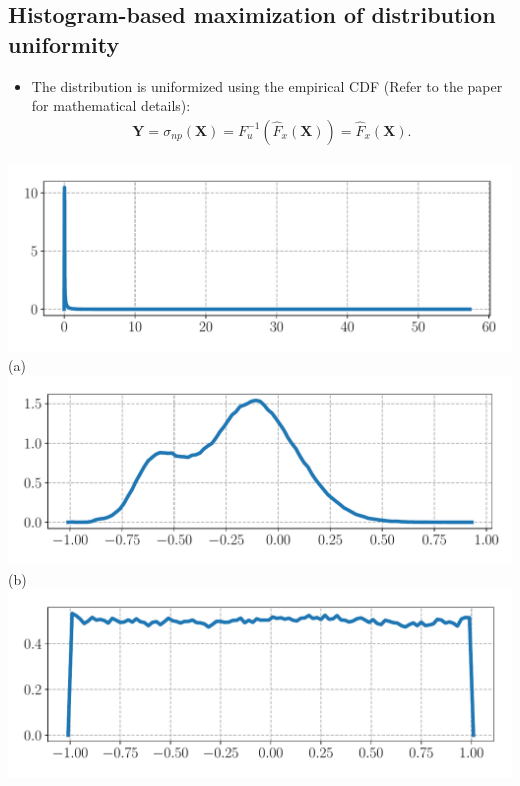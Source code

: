 \documentclass[a0,portrait]{a0poster}
\newenvironment{Figure}
  {\par\medskip\noindent\minipage{\linewidth}}
  {\endminipage\par\medskip}
\begin{document}
\begin{multicols}{2}
\subsection{Histogram-based maximization of distribution uniformity}
\begin{itemize}
\item The distribution is uniformized using the empirical CDF (Refer to the paper for mathematical details):
\begin{align}
  \mathbf{Y} = \sigma_{np}(\mathbf{X}) 
     = F_u^{-1} \left(\hat{F}_x(\mathbf{X})\right)
      = \hat{F}_x(\mathbf{X}).
  \label{eq:histogram_mud_simple}
\end{align}
\end{itemize}
%
%
\begin{minipage}[]{0.54\linewidth}
  \begin{Figure}
  \begin{center}
    {
      \includegraphics[width=170mm]{mel_filterbank_energy_histogram}
      \label{fig:mel_filterbank_energy_histogram} \\
      (a)
    }   
    \\  
    {
      \includegraphics[width=170mm]{power_function_based_mud_output_histogram}
      \label{fig:power_function_based_mud_output_histogram} \\
      (b)
    }   
    \\  
    {
      \includegraphics[width=170mm]{histogram_based_mud_output_histogram}
}
\end{center}
\end{Figure}
\end{minipage}
\end{multicols}
\end{document}
